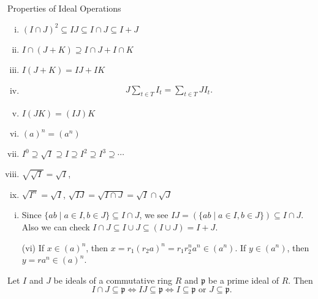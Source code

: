 \begin{proposition}{Properties of Ideal Operations}{}
    \begin{enumerate}[(i)]
        \item $(I\cap J)^2 \subseteq I J \subseteq I \cap J \subseteq I+J$
        \item ${I} \cap({J}+{K}) \supseteq {I} \cap {J}+{I} \cap {K}$
        \item ${I} ({J}+{K}) = {I}  {J}+{I}  {K}$
        \item $$
        \begin{gathered}
        J\sum_{t \in T} I_t=\sum_{t \in T} J I_t.
        \end{gathered}
        $$
        \item $I(J K)=(I J) K$
        \item $(a)^n=(a^n)$
        \item $I^0 \supseteq \sqrt{I} \supseteq I \supseteq I^2 \supseteq I^3 \supseteq \cdots$
        \item $\sqrt{\sqrt{I}} = \sqrt{I}$,
        \item $\sqrt{I^n}=\sqrt{I}$, $\sqrt{I J}=\sqrt{I \cap J}=\sqrt{I} \cap \sqrt{J}$
    \end{enumerate}
\end{proposition}

\begin{prf}
    \begin{enumerate}[(i)]
        \item Since $\{ab\mid a\in I,b\in J\}\subseteq I\cap J$, we see $IJ=\left(\{ab\mid a\in I,b\in J\}\right)\subseteq I\cap J$. Also we can check $I \cap J \subseteq I \cup J\subseteq (I \cup J)=I+J$.
        \item[(vi)] If $x\in(a)^n$, then $x=r_1(r_2a)^n=r_1r_2^na^n\in(a^n)$. If $y\in(a^n)$, then $y=ra^n\in(a)^n$.
    \end{enumerate}
\end{prf}


\begin{proposition}{}{}
    Let $I$ and $J$ be ideals of a commutative ring $R$ and $\mathfrak{p}$ be a prime ideal of $R$. Then 
    \[
        I\cap J\subseteq \mathfrak{p}\iff IJ\subseteq \mathfrak{p}\iff I\subseteq \mathfrak{p}\text{ or }J\subseteq \mathfrak{p}.
    \]
\end{proposition}

